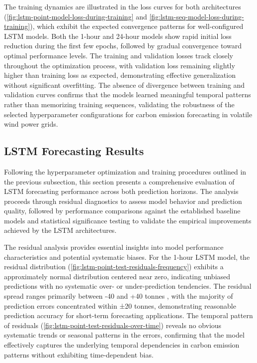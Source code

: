 The training dynamics are illustrated in the loss curves for both architectures (\autoref{fig:lstm-point-model-loss-during-training} and \autoref{fig:lstm-seq-model-loss-during-training}), which exhibit the expected convergence patterns for well-configured LSTM models. Both the 1-hour and 24-hour models show rapid initial loss reduction during the first few epochs, followed by gradual convergence toward optimal performance levels. The training and validation losses track closely throughout the optimization process, with validation loss remaining slightly higher than training loss as expected, demonstrating effective generalization without significant overfitting. The absence of divergence between training and validation curves confirms that the models learned meaningful temporal patterns rather than memorizing training sequences, validating the robustness of the selected hyperparameter configurations for carbon emission forecasting in volatile wind power grids.

\subsection{LSTM Forecasting Results}

Following the hyperparameter optimization and training procedures outlined in the previous subsection, this section presents a comprehensive evaluation of LSTM forecasting performance across both prediction horizons. The analysis proceeds through residual diagnostics to assess model behavior and prediction quality, followed by performance comparisons against the established baseline models and statistical significance testing to validate the empirical improvements achieved by the LSTM architectures.

The residual analysis provides essential insights into model performance characteristics and potential systematic biases. For the 1-hour LSTM model, the residual distribution (\autoref{fig:lstm-point-test-residuals-frequency}) exhibits a approximately normal distribution centered near zero, indicating unbiased predictions with no systematic over- or under-prediction tendencies. The residual spread ranges primarily between -40 and +40 tonnes \cotwoe{}, with the majority of prediction errors concentrated within ±20 tonnes, demonstrating reasonable prediction accuracy for short-term forecasting applications. The temporal pattern of residuals (\autoref{fig:lstm-point-test-residuals-over-time}) reveals no obvious systematic trends or seasonal patterns in the errors, confirming that the model effectively captures the underlying temporal dependencies in carbon emission patterns without exhibiting time-dependent bias.

